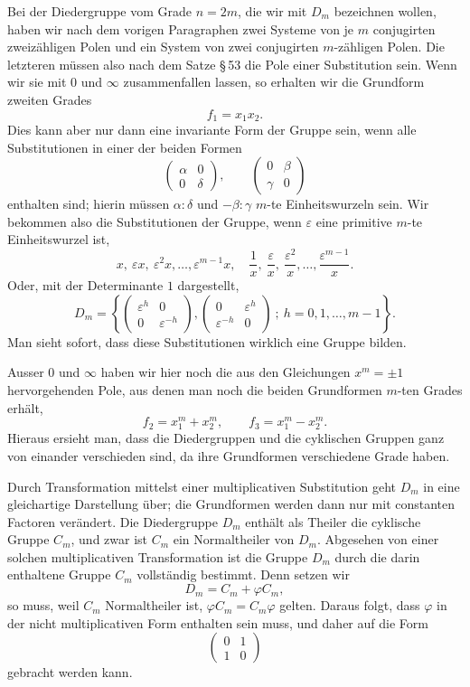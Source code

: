 \documentclass[11pt]{article}
\providecommand{\eps}{\varepsilon}
\providecommand{\eps}{\varepsilon}
\providecommand{\mat}[4]{\begin{pmatrix}#1&#2\\#3&#4\end{pmatrix}}
\providecommand{\mat}[4]{\begin{pmatrix}#1&#2\\#3&#4\end{pmatrix}}
\providecommand{\mat}[1]{\begin{pmatrix}#1\end{pmatrix}}
\begin{document}
Bei der Diedergruppe vom Grade $n=2m$, die wir mit $D_m$ bezeichnen wollen, haben wir nach dem vorigen Paragraphen zwei Systeme von je $m$ conjugirten zweizähligen Polen und ein System von zwei conjugirten $m$-zähligen Polen. Die letzteren müssen also nach dem Satze \S\,53 die Pole einer Substitution sein. Wenn wir sie mit $0$ und $\infty$ zusammenfallen lassen, so erhalten wir die Grundform zweiten Grades
\begin{equation}
 f_1=x_1x_2 .
\tag{4}
\end{equation}
Dies kann aber nur dann eine invariante Form der Gruppe sein, wenn alle Substitutionen in einer der beiden Formen
\[
 \mat{\alpha}{0}{0}{\delta},\qquad
 \mat{0}{\beta}{\gamma}{0}
\]
enthalten sind; hierin müssen $\alpha:\delta$ und $-\beta:\gamma$ $m$-te Einheitswurzeln sein. Wir bekommen also die Substitutionen der Gruppe, wenn $\eps$ eine primitive $m$-te Einheitswurzel ist,
\[
x,\ \eps x,\ \eps^2x,\ldots,\eps^{m-1}x,\quad
\frac1x,\ \frac{\eps}{x},\ \frac{\eps^2}{x},\ldots,\frac{\eps^{m-1}}x .
\]
Oder, mit der Determinante $1$ dargestellt,
\begin{equation}
D_m=\left\{
 \mat{\eps^h}{0}{0}{\eps^{-h}},
 \mat{0}{\eps^h}{\eps^{-h}}{0}
 \ ;\ h=0,1,\ldots,m-1
\right\}.
\tag{5}
\end{equation}
Man sieht sofort, dass diese Substitutionen wirklich eine Gruppe bilden.

Ausser $0$ und $\infty$ haben wir hier noch die aus den Gleichungen $x^m=\pm1$ hervorgehenden Pole, aus denen man noch die beiden Grundformen $m$-ten Grades erhält,
\begin{equation}
 f_2=x_1^m+x_2^m,\qquad
 f_3=x_1^m-x_2^m .
\tag{6}
\end{equation}
Hieraus ersieht man, dass die Diedergruppen und die cyklischen Gruppen ganz von einander verschieden sind, da ihre Grundformen verschiedene Grade haben.

Durch Transformation mittelst einer multiplicativen Substitution geht $D_m$ in eine gleichartige Darstellung über; die Grundformen werden dann nur mit constanten Factoren verändert. Die Diedergruppe $D_m$ enthält als Theiler die cyklische Gruppe $C_m$, und zwar ist $C_m$ ein Normaltheiler von $D_m$. Abgesehen von einer solchen multiplicativen Transformation ist die Gruppe $D_m$ durch die darin enthaltene Gruppe $C_m$ vollständig bestimmt. Denn setzen wir
\[
D_m=C_m+\varphi C_m,
\]
so muss, weil $C_m$ Normaltheiler ist, $\varphi C_m=C_m\varphi$ gelten. Daraus folgt, dass $\varphi$ in der nicht multiplicativen Form enthalten sein muss, und daher auf die Form
\[
 \mat{0}{1}{1}{0}
\]
gebracht werden kann.
\end{document}

